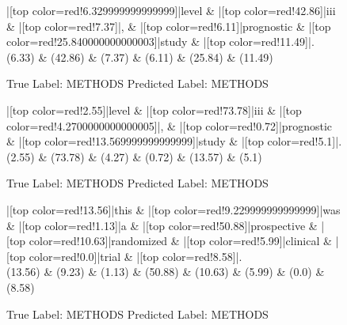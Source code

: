 \documentclass[a4paper, landscape]{article}
\begin{document}
\begin{figure}
\begin{center}
\begin{dependency}
\begin{deptext}
|[top color=red!6.329999999999999]|level \& |[top color=red!42.86]|iii \& |[top color=red!7.37]|, \& |[top color=red!6.11]|prognostic \& |[top color=red!25.840000000000003]|study \& |[top color=red!11.49]|.\\
(6.33) \& (42.86) \& (7.37) \& (6.11) \& (25.84) \& (11.49)\\
\end{deptext}
\end{dependency}
\end{center}
\caption{True Label: METHODS Predicted Label: METHODS}
\end{figure}
\clearpage
\begin{figure}
\begin{center}
\begin{dependency}
\begin{deptext}
|[top color=red!2.55]|level \& |[top color=red!73.78]|iii \& |[top color=red!4.2700000000000005]|, \& |[top color=red!0.72]|prognostic \& |[top color=red!13.569999999999999]|study \& |[top color=red!5.1]|.\\
(2.55) \& (73.78) \& (4.27) \& (0.72) \& (13.57) \& (5.1)\\
\end{deptext}
\end{dependency}
\end{center}
\caption{True Label: METHODS Predicted Label: METHODS}
\end{figure}
\clearpage
\begin{figure}
\begin{center}
\begin{dependency}
\begin{deptext}
|[top color=red!13.56]|this \& |[top color=red!9.229999999999999]|was \& |[top color=red!1.13]|a \& |[top color=red!50.88]|prospective \& |[top color=red!10.63]|randomized \& |[top color=red!5.99]|clinical \& |[top color=red!0.0]|trial \& |[top color=red!8.58]|.\\
(13.56) \& (9.23) \& (1.13) \& (50.88) \& (10.63) \& (5.99) \& (0.0) \& (8.58)\\
\end{deptext}
\end{dependency}
\end{center}
\caption{True Label: METHODS Predicted Label: METHODS}
\end{figure}
\end{document}
